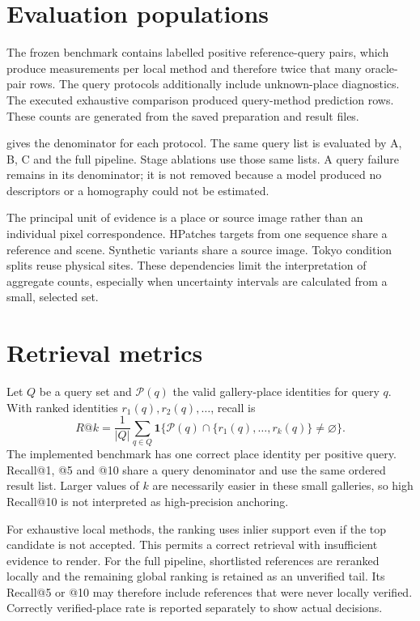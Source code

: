 \section{Evaluation populations}
The frozen benchmark contains \OraclePairs{} labelled positive reference-query pairs, which produce \OraclePairs{} measurements per local method and therefore twice that many oracle-pair rows. The query protocols additionally include unknown-place diagnostics. The executed exhaustive comparison produced \PredictionRows{} query-method prediction rows. These counts are generated from the saved preparation and result files.

 gives the denominator for each protocol. The same query list is evaluated by A, B, C and the full pipeline. Stage ablations use those same lists. A query failure remains in its denominator; it is not removed because a model produced no descriptors or a homography could not be estimated.

The principal unit of evidence is a place or source image rather than an individual pixel correspondence. HPatches targets from one sequence share a reference and scene. Synthetic variants share a source image. Tokyo condition splits reuse physical sites. These dependencies limit the interpretation of aggregate counts, especially when uncertainty intervals are calculated from a small, selected set.

\section{Retrieval metrics}
Let $Q$ be a query set and $\mathcal P(q)$ the valid gallery-place identities for query $q$. With ranked identities $r_1(q),r_2(q),\ldots$, recall is
\begin{equation}
 R@k=\frac1{|Q|}\sum_{q\in Q}
 \mathbf1\{\mathcal P(q)\cap\{r_1(q),\ldots,r_k(q)\}\neq\varnothing\}.
\end{equation}
The implemented benchmark has one correct place identity per positive query. Recall@1, @5 and @10 share a query denominator and use the same ordered result list. Larger values of $k$ are necessarily easier in these small galleries, so high Recall@10 is not interpreted as high-precision anchoring.

For exhaustive local methods, the ranking uses inlier support even if the top candidate is not accepted. This permits a correct retrieval with insufficient evidence to render. For the full pipeline, shortlisted references are reranked locally and the remaining global ranking is retained as an unverified tail. Its Recall@5 or @10 may therefore include references that were never locally verified. Correctly verified-place rate is reported separately to show actual decisions.

